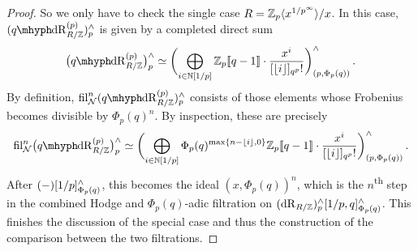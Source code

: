 \documentclass[DIV=12,numbers=enddot,leqno,bibliography=totoc]{scrartcl}
\begin{document}
\begin{proof}
		So we only have to check the single case $R=\mathbb{Z}_p\langle x^{1/p^\infty}\rangle/x$. In this case, $(\qdeRham_{R/\IZ}^{(p)})_p^\complete$ is given by a completed direct sum
		\begin{equation*}
			\bigl(\qdeRham_{R/\IZ}^{(p)}\bigr)_p^\complete\simeq\biggl(\bigoplus_{i\in\IN[1/p]}\IZ_p\qpower\cdot\frac{x^i}{[\lfloor i\rfloor]_{q^p}!}\biggr)_{(p,\Phi_p(q))}^\complete\,.
		\end{equation*}
		By definition, $ \fil_\Nn^n(\qdeRham_{R/\IZ}^{(p)})_p^\complete$ consists of those elements whose Frobenius becomes divisible by $\Phi_p(q)^n$. By inspection, these are precisely
		\begin{equation*}
			\fil_\Nn^n\bigl(\qdeRham_{R/\IZ}^{(p)}\bigr)_p^\complete\simeq \biggl(\bigoplus_{i\in\IN[1/p]}\Phi_p(q)^{\max\{n-\lfloor i\rfloor,0\}}\IZ_p\qpower\cdot\frac{x^i}{[\lfloor i\rfloor]_{q^p}!}\biggr)_{(p,\Phi_p(q))}^\complete\,.
		\end{equation*}
		After $(-)[1/p]_{\Phi_p(q)}^\wedge$, this becomes the ideal $(x,\Phi_p(q))^n$, which is the $n$\textsuperscript{th} step in the combined Hodge and $\Phi_p(q)$-adic filtration on $(\mathrm{dR}_{R/\mathbb{Z}})_p^\wedge[1/p,q]_{\Phi_p(q)}^\wedge$. This finishes the discussion of the special case and thus the construction of the comparison between the two filtrations.
		

\end{proof}
\end{document}
